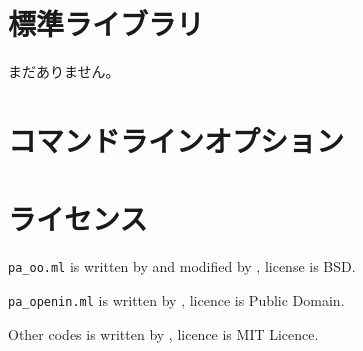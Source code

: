 \documentclass{article}
\begin{document}
\section{標準ライブラリ}
まだありません。

\section{コマンドラインオプション}

\section{ライセンス}
\verb!pa_oo.ml! is written by  and modified by
, license is BSD.

\verb!pa_openin.ml! is written by , licence is Public Domain.

Other codes is written by , licence is MIT Licence.
\end{document}

